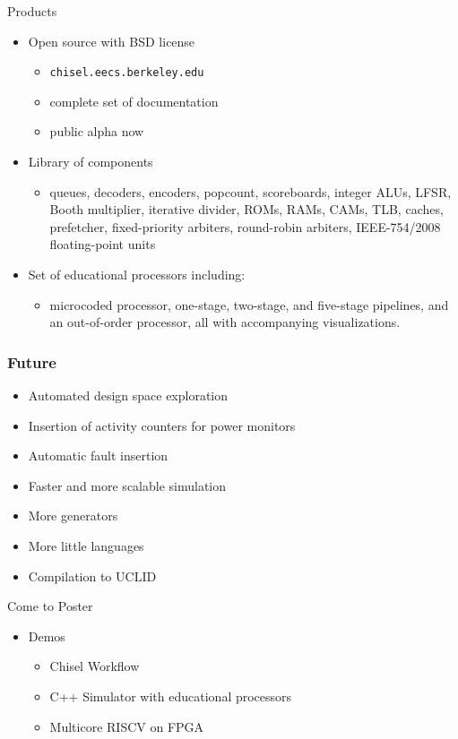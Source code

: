 \documentclass[xcolor=pdflatex,dvipsnames,table]{beamer}
\begin{document}
\begin{frame}[fragile]{Products}

\begin{itemize}
\item Open source with BSD license
\begin{itemize}
\item \verb+chisel.eecs.berkeley.edu+
\item complete set of documentation
\item public alpha now
\end{itemize}
\item Library of components
\begin{itemize}
\item queues, decoders, encoders, popcount, scoreboards, integer ALUs, LFSR, Booth multiplier, iterative divider, ROMs, RAMs, CAMs, TLB, caches, prefetcher, fixed-priority arbiters, round-robin arbiters, IEEE-754/2008 floating-point units
\end{itemize}
\item Set of educational processors including:
\begin{itemize}
\item microcoded processor, one-stage, two-stage, and five-stage pipelines, and an out-of-order processor, all with accompanying visualizations.
\end{itemize}
\end{itemize}

\end{frame}

\ifx\poster\undefined
\begin{frame}[fragile]
\frametitle{Future}

\begin{itemize}
\item Automated design space exploration
\item Insertion of activity counters for power monitors
\item Automatic fault insertion
\item Faster and more scalable simulation
\item More generators
\item More little languages
\item Compilation to UCLID
\end{itemize}

\end{frame}
\fi

\ifx\poster\undefined
\begin{frame}[fragile]{Come to Poster}

\begin{itemize}
\item Demos
\begin{itemize}
\item Chisel Workflow
\item C++ Simulator with educational processors
\item Multicore RISCV on FPGA
\end{itemize}
\end{itemize}

\end{frame}
\fi
\end{document}
